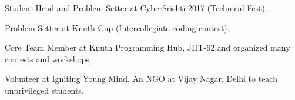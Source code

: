\documentclass[]{hieudo-build}
\begin{document}
\begin{minipage}[t]{0.69\textwidth}
\vspace{0.5em} %
\begin{tightemize}
\item 	Student Head and Problem Setter at CyberSrishti-2017 (Technical-Fest).
\item Problem Setter at Knuth-Cup (Intercollegiate coding contest).
\item Core Team Member at Knuth Programming Hub, JIIT-62 and organized many contests and workshops.
\item Volunteer at Igniting Young Mind, An NGO at Vijay Nagar, Delhi to teach unprivileged students.
\end{tightemize}
\sectionsep



\end{minipage} 
\end{document}
